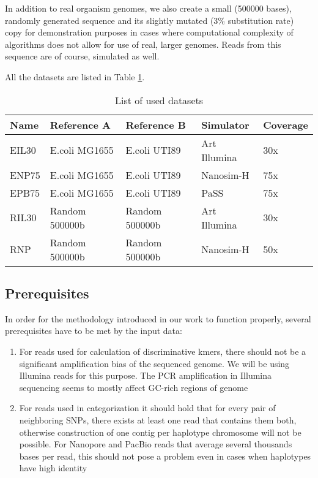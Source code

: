 In addition to real organism genomes, we also create a small (500000 bases), randomly generated sequence and its slightly mutated (3\% substitution rate) copy for demonstration purposes in cases where computational complexity of algorithms does not allow for use of real, larger genomes. Reads from this sequence are of course, simulated as well.

All the datasets are listed in Table \ref{table:datasets}.

\begin{table}[]
\begin{tabular}{|l|l|l|l|l|}
\hline
\textbf{Name} & \textbf{Reference A} & \textbf{Reference B} & \textbf{Simulator} & \textbf{Coverage} \\ \hline
EIL30         & E.coli MG1655        & E.coli UTI89         & Art Illumina       & 30x               \\ \hline
ENP75         & E.coli MG1655        & E.coli UTI89         & Nanosim-H          & 75x               \\ \hline
EPB75         & E.coli MG1655        & E.coli UTI89         & PaSS               & 75x               \\ \hline
RIL30         & Random 500000b       & Random 500000b       & Art Illumina       & 30x               \\ \hline
RNP           & Random 500000b       & Random 500000b       & Nanosim-H          & 50x               \\ \hline
\end{tabular}
\caption{List of used datasets}
\label{table:datasets}
\end{table}


\subsection{Prerequisites}

In order for the methodology introduced in our work to function properly, several prerequisites have to be met by the input data:
\begin{enumerate}
	\item{For reads used for calculation of discriminative kmers, there should not be a significant amplification bias of the sequenced genome. We will be using Illumina reads for this purpose. The PCR amplification in Illumina sequencing seems to mostly affect GC-rich regions of genome\cite{aird2011analyzing}}
	\item{For reads used in categorization it should hold that for every pair of neighboring SNPs, there exists at least one read that contains them both, otherwise construction of one contig per haplotype chromosome will not be possible. For Nanopore and PacBio reads that average several thousands bases per read, this should not pose a problem even in cases when haplotypes have high identity}
\end{enumerate}